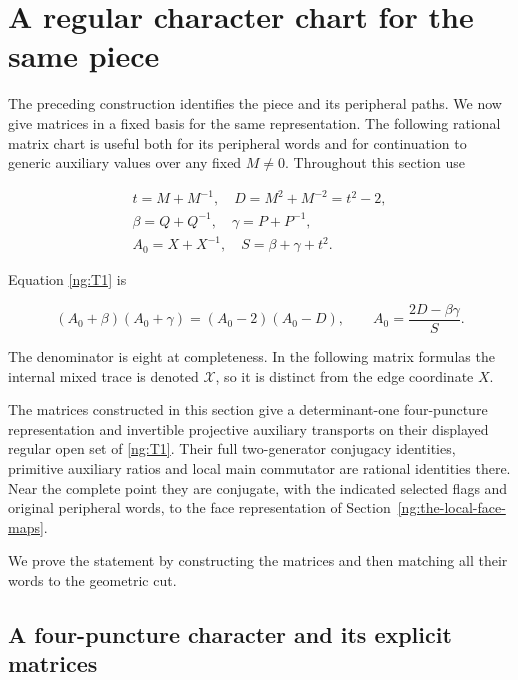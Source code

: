 \section{A regular character chart for the same piece}\label{ng:a-regular-character-chart-for-the-same-piece}

The preceding construction identifies the piece and its peripheral
paths. We now give matrices in a fixed basis for the same representation. The following rational
matrix chart is useful both for its peripheral words and for continuation
to generic auxiliary values over any fixed \(M\ne0\).
Throughout this section use

\begin{equation}\label{ng:C0}
\begin{gathered}
 t=M+M^{-1},\quad D=M^2+M^{-2}=t^2-2,\\
 \beta=Q+Q^{-1},\quad\gamma=P+P^{-1},\\
 A_0=X+X^{-1},\quad S=\beta+\gamma+t^2.
 \end{gathered}
\end{equation}

Equation \eqref{ng:T1} is

\begin{equation}\label{ng:C0a}
(A_0+\beta)(A_0+\gamma)=(A_0-2)(A_0-D),\qquad
 A_0=\frac{2D-\beta\gamma}{S}.
\end{equation}

The denominator is eight at completeness. In the following matrix
formulas the internal mixed trace is denoted \(\mathcal X\), so it
is distinct from the edge coordinate \(X\).

\begin{theorem}\label{ng:character}
The matrices constructed in this section give a determinant-one
four-puncture representation and invertible projective auxiliary
transports on their displayed regular open set of \eqref{ng:T1}.
Their full two-generator conjugacy identities, primitive auxiliary
ratios and local main commutator are rational identities there.
Near the complete point they are conjugate, with the indicated
selected flags and original peripheral words, to the face
representation of Section~\ref{ng:the-local-face-maps}.
\end{theorem}

We prove the statement by constructing the matrices and then matching
all their words to the geometric cut.

\subsection{A four-puncture character and its explicit matrices}\label{ng:a-four-puncture-character-and-its-explicit-matrices}

